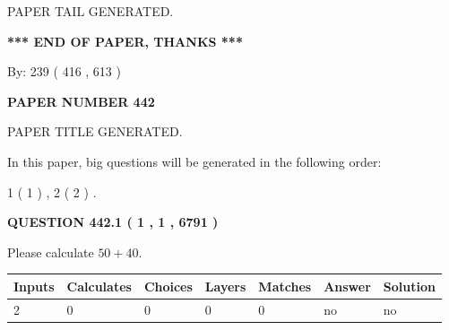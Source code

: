 \documentclass[12pt]{article}
\begin{document}
   
   
\vspace{2.0in} PAPER TAIL GENERATED.
   
   
   
   
\vspace{1.0in} 
{\textbf{\large{ *** END OF PAPER, THANKS *** }}} 
   
   
\hspace{1.0in} By: 
 239 ( 416 ,  613 )
   
   
   
   
\newpage 
\setcounter{page}{ 
   442001 } 
   
   
   
   
 {\textbf{ \Large{ PAPER NUMBER  442  }}}
   
   
\vspace{0.2in}
   
   
   
   
   
   
   
   
 \vspace{0.2in}
 
 
 
 
   
   
 PAPER TITLE GENERATED.
   
   
   
\vspace{0.2in}
   
In this paper, big questions will be generated in the following order: 
   
   
   1 ( 1 )
 ,
   2 ( 2 )
 .
  
\vspace{0.2in}
  
{\textbf{\Large{QUESTION
442.1 
 ( 1 , 1 , 6791 )
}}}
  
  
 
Please calculate $ %
50 +  %
40 $.
 
 
   
   
   
   
\noindent\begin{tabular}{|l|l|l|l|l|l|l|}
 \hline
Inputs & Calculates & Choices & Layers & Matches & Answer & Solution \\ \hline
 2  & 
 0  & 
 0
  & 
 0  & 
 0  & 
  no & 
  no 
  \\ \hline
 \end{tabular}
   
\end{document}
